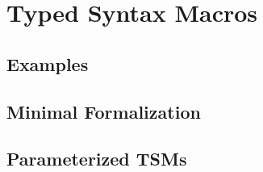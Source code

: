 \chapter{Typed Syntax Macros}\label{chap:tsms}
\section{Examples}\label{sec:tsms-examples}
\section{Minimal Formalization}\label{sec:tsms-minimal-formalism}
\section{Parameterized TSMs}\label{sec:tsms-parameterized}

